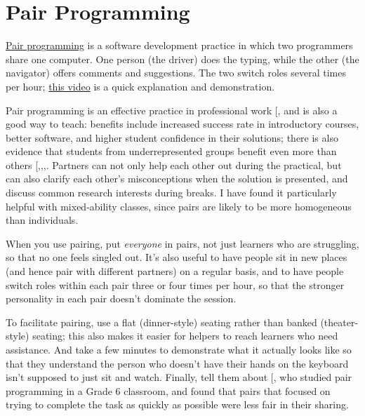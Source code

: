 \section{Pair Programming}\label{s:classroom-pair}

\protect\hyperlink{g:pair-programming}{Pair programming} is a software development
practice in which two programmers share one computer. One person (the
driver) does the typing, while the other (the navigator) offers
comments and suggestions. The two switch roles several times per hour;
\href{https://www.youtube.com/watch?v=vgkahOzFH2Q}{this video} is a quick explanation and
demonstration.

Pair programming is an effective practice in professional work
{[}\protect[\hyperlink{b:Hann2009}{Hann2009}]{]}, and is also a good way to teach: benefits include
increased success rate in introductory courses, better software, and
higher student confidence in their solutions; there is also evidence
that students from underrepresented groups benefit even more than
others
{[},,,\protect[\hyperlink{b:Cele2018}{Cele2018}]{]}.
Partners can not only help each other out during the practical, but
can also clarify each other's misconceptions when the solution is
presented, and discuss common research interests during breaks. I have
found it particularly helpful with mixed-ability classes, since pairs
are likely to be more homogeneous than individuals.

When you use pairing, put \emph{everyone} in pairs, not just learners who are
struggling, so that no one feels singled out. It's also useful to have
people sit in new places (and hence pair with different partners) on a
regular basis, and to have people switch roles within each pair three or
four times per hour, so that the stronger personality in each pair
doesn't dominate the session.

To facilitate pairing, use a flat (dinner-style) seating rather than
banked (theater-style) seating; this also makes it easier for helpers to
reach learners who need assistance. And take a few minutes to
demonstrate what it actually looks like so that they understand the
person who doesn't have their hands on the keyboard isn't supposed to
just sit and watch. Finally, tell them about {[}\protect[\hyperlink{b:Lewi2015}{Lewi2015}]{]}, who
studied pair programming in a Grade 6 classroom, and found that pairs
that focused on trying to complete the task as quickly as possible were
less fair in their sharing.

